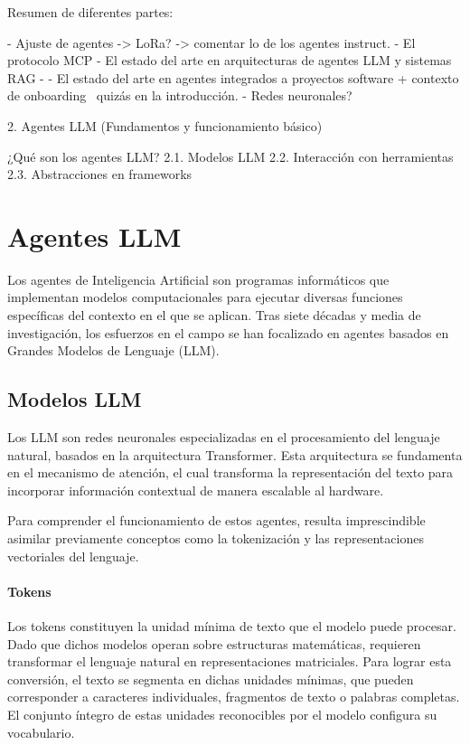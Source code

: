 Resumen de diferentes partes: 

- Ajuste de agentes -> LoRa? -> comentar lo de los agentes instruct.
- El protocolo MCP
- El estado del arte en arquitecturas de agentes LLM y sistemas RAG
- 
- El estado del arte en agentes integrados a proyectos software + contexto de onboarding ~quizás en la introducción.
- Redes neuronales?

2. Agentes LLM (Fundamentos y funcionamiento básico)

¿Qué son los agentes LLM?
2.1. Modelos LLM
2.2. Interacción con herramientas
2.3. Abstracciones en frameworks


\section{Agentes LLM}

Los agentes de Inteligencia Artificial son programas informáticos que implementan modelos computacionales para ejecutar diversas funciones específicas del contexto en el que se aplican. Tras siete décadas y media de investigación, los esfuerzos en el campo se han focalizado en agentes basados en Grandes Modelos de Lenguaje (LLM). 

\subsection{Modelos LLM}

Los LLM son redes neuronales especializadas en el procesamiento del lenguaje natural, basados en la arquitectura Transformer. Esta arquitectura se fundamenta en el mecanismo de atención, el cual transforma la representación del texto para incorporar información contextual de manera escalable al hardware. 

Para comprender el funcionamiento de estos agentes, resulta imprescindible asimilar previamente conceptos como la tokenización y las representaciones vectoriales del lenguaje.

\paragraph{Tokens}
Los tokens constituyen la unidad mínima de texto que el modelo puede procesar. Dado que dichos modelos operan sobre estructuras matemáticas, requieren transformar el lenguaje natural en representaciones matriciales. Para lograr esta conversión, el texto se segmenta en dichas unidades mínimas, que pueden corresponder a caracteres individuales, fragmentos de texto o palabras completas. El conjunto íntegro de estas unidades reconocibles por el modelo configura su vocabulario. 


